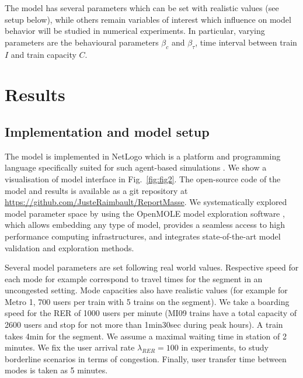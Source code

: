 \documentclass[3p,times,procedia]{elsarticle}
\begin{document}
The model has several parameters which can be set with realistic values (see setup below), while others remain variables of interest which influence on model behavior will be studied in numerical experiments. In particular, varying parameters are the behavioural parameters $\beta_c$ and $\beta_{\tau}$, time interval between train $I$ and train capacity $C$.



\section{Results}



\subsection{Implementation and model setup}


The model is implemented in NetLogo which is a platform and programming language specifically suited for such agent-based simulations \citep{tisue2004netlogo}. We show a visualisation of model interface in Fig.~\ref{fig:fig2}. The open-source code of the model and results is available as a git repository at \url{https://github.com/JusteRaimbault/ReportMasse}. We systematically explored model parameter space by using the OpenMOLE model exploration software \citep{reuillon2013openmole}, which allows embedding any type of model, provides a seamless access to high performance computing infrastructures, and integrates state-of-the-art model validation and exploration methods.

Several model parameters are set following real world values. Respective speed for each mode for example correspond to travel times for the segment in an uncongested setting. Mode capacities also have realistic values (for example for Metro 1, 700 users per train with 5 trains on the segment). We take a boarding speed for the RER of 1000 users per minute (MI09 trains have a total capacity of 2600 users and stop for not more than 1min30sec during peak hours). A train takes 4min for the segment. We assume a maximal waiting time in station of 2 minutes. We fix the user arrival rate $\lambda_{RER} = 100$ in experiments, to study borderline scenarios in terms of congestion. Finally, user transfer time between modes is taken as 5 minutes.
\end{document}
